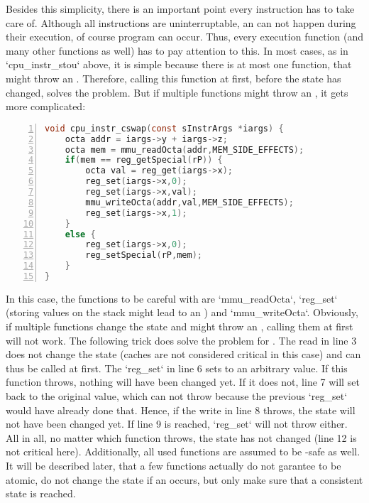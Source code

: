 Besides this simplicity, there is an important point every instruction has to take care of. Although all instructions are uninterruptable, \ie an  can not happen during their execution, of course program  can occur. Thus, every execution function (and many other functions as well) has to pay attention to this. In most cases, as in `cpu_instr_stou` above, it is simple because there is at most one function, that might throw an . Therefore, calling this function at first, \ie before the state has changed, solves the problem. But if multiple functions might throw an , it gets more complicated:
\begin{lstlisting}[language=C,numbers=left,numberstyle=\footnotesize,caption=Execution function of \mi{CSWAP}]
void cpu_instr_cswap(const sInstrArgs *iargs) {
	octa addr = iargs->y + iargs->z;
	octa mem = mmu_readOcta(addr,MEM_SIDE_EFFECTS);
	if(mem == reg_getSpecial(rP)) {
		octa val = reg_get(iargs->x);
		reg_set(iargs->x,0);
		reg_set(iargs->x,val);
		mmu_writeOcta(addr,val,MEM_SIDE_EFFECTS);
		reg_set(iargs->x,1);
	}
	else {
		reg_set(iargs->x,0);
		reg_setSpecial(rP,mem);
	}
}
\end{lstlisting}
In this case, the functions to be careful with are `mmu_readOcta`, `reg_set` (storing values on the stack might lead to an ) and `mmu_writeOcta`. Obviously, if multiple functions change the state and might throw an , calling them at first will not work. The following trick does solve the problem for . The read in line 3 does not change the state (caches are not considered critical in this case) and can thus be called at first. The `reg_set` in line 6 sets  to an arbitrary value. If this function throws, nothing will have been changed yet. If it does not, line 7 will set  back to the original value, which can not throw because the previous `reg_set` would have already done that. Hence, if the write in line 8 throws, the state will not have been changed yet. If line 9 is reached, `reg_set` will not throw either. All in all, no matter which function throws, the state has not changed (line 12 is not critical here). Additionally, all used functions are assumed to be -safe as well. It will be described later, that a few functions actually do not garantee to be atomic, \ie do not change the state if an  occurs, but only make sure that a consistent state is reached.

